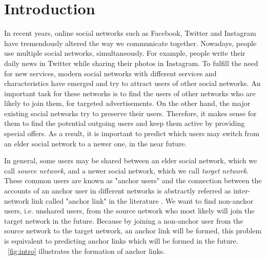 \documentclass[conference]{IEEEtran}
\begin{document}
\section{Introduction}
In recent years, online social networks such as Facebook, Twitter and Instagram have tremendously altered the way we communicate together. Nowadays, people use multiple social networks, simultaneously. For example, people write their daily news in Twitter while sharing their photos in Instagram. To fulfill the need for new services, modern social networks with different services and characteristics have emerged and try to attract users of other social networks. An important task for these networks is to find the users of other networks who are likely to join them, for targeted advertisements. On the other hand, the major existing social networks try to preserve their users. Therefore, it makes sense for them to find the potential outgoing users and keep them active by providing special offers. As a result, it is important to predict which users may switch from an elder social network to a newer one, in the near future.

In general, some users may be shared between an elder social network, which we call \textit{source network}, and a newer social network, which we call \textit{target network}. These common users are known as "anchor users" and the connection between the accounts of an anchor user in different networks is abstractly referred as inter-network link called "anchor link" in the literature \cite{kong2013}. We want to find non-anchor users, i.e. unshared users, from the source network who most likely will join the target network in the future. Because by joining a non-anchor user from the source network to the target network, an anchor link will be formed, this problem is equivalent to predicting anchor links which will be formed in the future. \figurename~\ref{fig:intro} illustrates the formation of anchor links.
\end{document}
